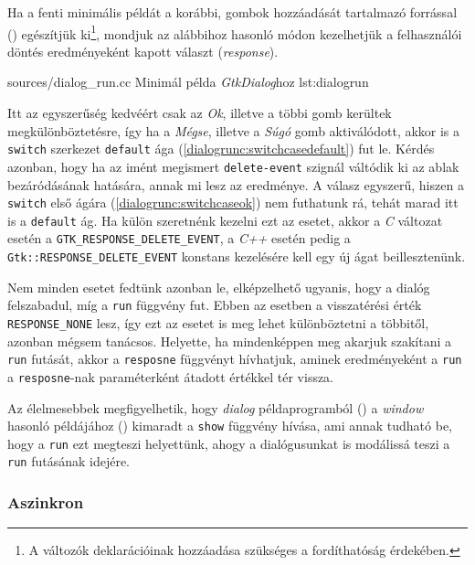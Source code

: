 Ha a fenti minimális példát a korábbi, gombok hozzáadását tartalmazó forrással () egészítjük ki\footnote{A változók deklarációinak hozzáadása szükséges a fordíthatóság érdekében.}, mondjuk az alábbihoz hasonló módon kezelhetjük a felhasználói döntés eredményeként kapott választ (\textit{response}).

{sources/dialog_run.cc}
{Minimál példa \textit{GtkDialog}hoz}
{lst:dialogrun}

Itt az egyszerűség kedvéért csak az \textit{Ok}, illetve a többi gomb kerültek megkülönböztetésre, így ha a \textit{Mégse}, illetve a \textit{Súgó} gomb aktiválódott, akkor is a \texttt{switch} szerkezet \texttt{default} ága (\ref{dialogrunc:switchcasedefault}) fut le. Kérdés azonban, hogy ha az imént megismert \texttt{delete-event} szignál váltódik ki az ablak bezáródásának hatására, annak mi lesz az eredménye. A válasz egyszerű, hiszen a \texttt{switch} első ágára (\ref{dialogrunc:switchcaseok}) nem futhatunk rá, tehát marad itt is a \texttt{default} ág. Ha külön szeretnénk kezelni ezt az esetet, akkor a \textit{C} változat esetén a \texttt{GTK\_RESPONSE\_DELETE\_EVENT}, a \textit{C++} esetén pedig a \texttt{Gtk::RESPONSE\_DELETE\_EVENT} konstans kezelésére kell egy új ágat beillesztenünk.

Nem minden esetet fedtünk azonban le, elképzelhető ugyanis, hogy a dialóg felszabadul, míg a \texttt{run} függvény fut. Ebben az esetben a visszatérési érték \texttt{RESPONSE\_NONE} lesz, így ezt az esetet is meg lehet különböztetni a többitől, azonban mégsem tanácsos. Helyette, ha mindenképpen meg akarjuk szakítani a \texttt{run} futását, akkor a \texttt{resposne} függvényt hívhatjuk, aminek eredményeként a \texttt{run} a \texttt{resposne}-nak paraméterként átadott értékkel tér vissza.

Az élelmesebbek megfigyelhetik, hogy \textit{dialog} példaprogramból () a \textit{window} hasonló példájához () kimaradt a \texttt{show} függvény hívása, ami annak tudható be, hogy a \texttt{run} ezt megteszi helyettünk, ahogy a dialógusunkat is modálissá teszi a \texttt{run} futásának idejére.

\subsubsection{Aszinkron}

